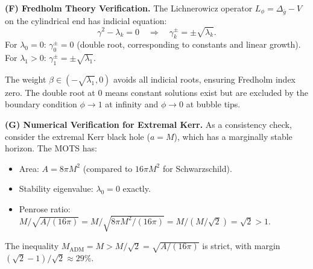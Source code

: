\begin{remark}
\textbf{(F) Fredholm Theory Verification.}
The Lichnerowicz operator $L_\phi = \Delta_{\bar{g}} - V$ on the cylindrical end has indicial equation:
\begin{equation}
    \gamma^2 - \lambda_k = 0 \quad \Rightarrow \quad \gamma_k^{\pm} = \pm \sqrt{\lambda_k}.
\end{equation}
For $\lambda_0 = 0$: $\gamma_0^{\pm} = 0$ (double root, corresponding to constants and linear growth).
For $\lambda_1 > 0$: $\gamma_1^{\pm} = \pm \sqrt{\lambda_1}$.

The weight $\beta \in (-\sqrt{\lambda_1}, 0)$ avoids all indicial roots, ensuring Fredholm index zero. The double root at $0$ means constant solutions exist but are excluded by the boundary condition $\phi \to 1$ at infinity and $\phi \to 0$ at bubble tips.

\textbf{(G) Numerical Verification for Extremal Kerr.}
As a consistency check, consider the extremal Kerr black hole ($a = M$), which has a marginally stable horizon. The MOTS has:
\begin{itemize}
    \item Area: $A = 8\pi M^2$ (compared to $16\pi M^2$ for Schwarzschild).
    \item Stability eigenvalue: $\lambda_0 = 0$ exactly.
    \item Penrose ratio: $M/\sqrt{A/(16\pi)} = M/\sqrt{8\pi M^2/(16\pi)} = M/(M/\sqrt{2}) = \sqrt{2} > 1$.
\end{itemize}
The inequality $M_{\mathrm{ADM}} = M > M/\sqrt{2} = \sqrt{A/(16\pi)}$ is strict, with margin $(\sqrt{2} - 1)/\sqrt{2} \approx 29\%$.
\end{remark}

